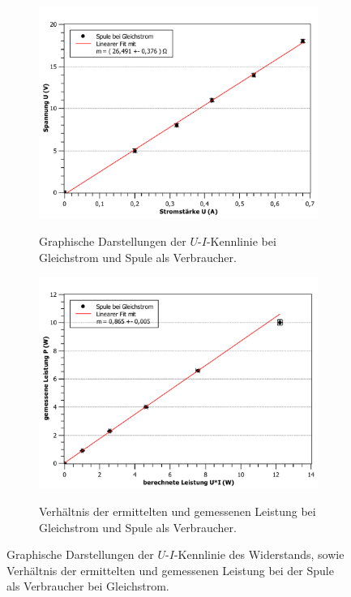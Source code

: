 \begin{figure}[ht]
	\centering	
	\begin{subfigure}{0.70\textwidth}
		\centering
		\includegraphics[width=\textwidth]{auswertung/spule-gleich-Widerstand.pdf}
		\label{fig:5}
		\caption{Graphische Darstellungen der $U$-$I$-Kennlinie bei Gleichstrom und Spule als Verbraucher.}	
	\end{subfigure}
	\begin{subfigure}{0.70\textwidth}
		\centering
		\includegraphics[width=\textwidth]{auswertung/spule-gleich-Leistung.pdf}
		\label{fig:6}
		\caption{Verhältnis der ermittelten und gemessenen Leistung bei Gleichstrom und Spule als Verbraucher.}	
	\end{subfigure}
	\caption{Graphische Darstellungen der $U$-$I$-Kennlinie des Widerstands, sowie Verhältnis der ermittelten und gemessenen Leistung bei der Spule als Verbraucher bei Gleichstrom.}
\end{figure}
